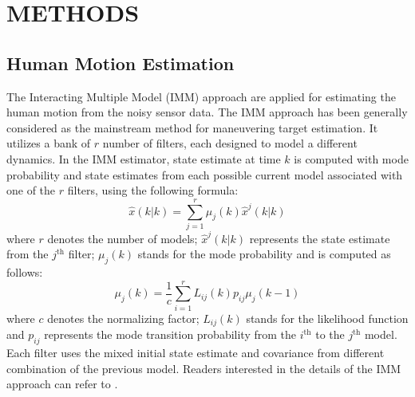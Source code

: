 \documentclass[letterpaper, 10 pt, conference]{ieeeconf}
\begin{document}
\section*{METHODS} \label{sec:framework}

\subsection*{Human Motion Estimation}\label{subsec:human_track}
The Interacting Multiple Model (IMM) approach are applied for estimating the human motion from the noisy sensor data.
The IMM approach has been generally considered as the mainstream method for maneuvering target estimation. 
It utilizes a bank of $r$ number of filters, each designed to model a different dynamics.
In the IMM estimator, state estimate at time $k$ is computed with mode probability and state estimates from each possible current model associated with one of the $r$ filters, using the following formula:
\[
\hat{x}(k|k)=\sum\limits_{j=1}^{r}\mu_j(k)\hat{x}^j(k|k)
\]
where $r$ denotes the number of models; $\hat{x}^j(k|k)$ represents the state estimate from the $j^\text{th}$ filter; $\mu_j(k)$ stands for the mode probability and is computed as follows:
\[
\mu_j(k)=\frac{1}{c}\sum\limits_{i=1}^{r}L_{ij}(k)p_{ij}\mu_j(k-1)
\]
where $c$ denotes the normalizing factor; $L_{ij}(k)$ stands for the likelihood function and $p_{ij}$ represents the mode transition probability from the $i^\text{th}$ to the $j^\text{th}$ model. 
Each filter uses the mixed initial state estimate and covariance from different combination of the previous model. 
Readers interested in the details of the IMM approach can refer to \cite{yaakov2002estimation}.

\end{document}
